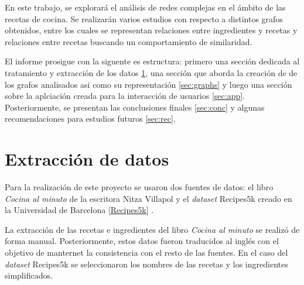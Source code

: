 \documentclass[a4paper]{article}
\begin{document}
En este trabajo, se explorará el análisis de redes complejas en el ámbito de las
recetas de cocina. Se realizarán varios estudios con respecto a distintos grafos
obtenidos, entre los cuales se representan relaciones entre ingredientes y
recetas y relaciones entre recetas buscando un comportamiento de similaridad.

El informe prosigue con la siguente es estructura: primero una sección dedicada
al tratamiento y extracción de los datos \ref{sec:data}, una sección que
aborda la creación de de los grafos analisados asi como su representación
\ref{sec:graphs} y luego una sección sobre la aplciación creada para la
interacción de usuarios \ref{sec:app}. Posteriormente, se presentan las
conclusiones finales \ref{sec:conc} y algunas recomendaciones para estudios
futuros \ref{sec:rec}.







\section{Extracción de datos}\label{sec:data}

Para la realización de este proyecto se usaron dos fuentes de datos: el libro
\emph{Cocina al minuto} de la escritora Nitza Villapol y el \emph{dataset}
Recipes5k creado en la Universidad de Barcelona [\href{http://www.ub.edu/cvub/recipes5k/}{Recipes5k}]
\cite{bolanos2017food}.

La extracción de las recetas e ingredientes del libro \emph{Cocina al minuto}
se realizó de forma manual. Posteriormente, estos datos fueron traducidos al
inglés con el objetivo de manternet la consistencia con el resto de las
fuentes. En el caso del \emph{dataset} Recipes5k se seleccionaron los nombres
de las recetas y los ingredientes simplificados.
\end{document}
